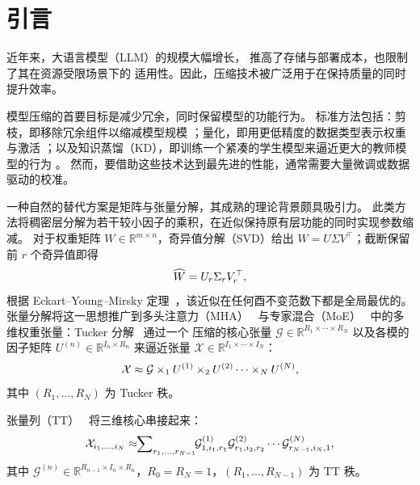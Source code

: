 \section{引言}
\label{sec:intro}

近年来，大语言模型（LLM）的规模大幅增长，
推高了存储与部署成本，也限制了其在资源受限场景下的
适用性。因此，压缩技术被广泛用于在保持质量的同时提升效率。

模型压缩的首要目标是减少冗余，同时保留模型的功能行为。
标准方法包括：剪枝，即移除冗余组件以缩减模型规模 \citep{OBC_2022, LLM_pruner_2023, unreasonable_ineffectiveness_2024}；量化，即用更低精度的数据类型表示权重与激活 \citep{GPTQ_2022, QUIP_2023, AQLM_2024, AWQ_2024, harp}；以及知识蒸馏（KD），即训练一个紧凑的学生模型来逼近更大的教师模型的行为 \citep{HintonDistil_2015, GKD_2023}。
然而，要借助这些技术达到最先进的性能，通常需要大量微调或数据驱动的校准。

一种自然的替代方案是矩阵与张量分解，其成熟的理论背景颇具吸引力。
此类方法将稠密层分解为若干较小因子的乘积，在近似保持原有层功能的同时实现参数缩减。
对于权重矩阵 $W \in \mathbb{R}^{m \times n}$，奇异值分解（SVD）给出 $W = U\Sigma V^\top$；截断保留前 $r$ 个奇异值即得
\begin{equation}
\label{eq:svd}
\vspace{-1mm}
\widehat{W} = U_r\Sigma_r V_r^\top, 
\end{equation}
根据 Eckart--Young--Mirsky 定理~\citep{Eckart_Young_1936, Eckart_Young_Mirsky_1960}，该近似在任何酉不变范数下都是全局最优的。
张量分解将这一思想推广到多头注意力（MHA）~\citep{Attention_Is_All_You_Need_2017} 与专家混合（MoE）~\citep{MoE_2022} 中的多维权重张量：Tucker 分解~\citep{tucker1966some, kolda2009tensor} 通过一个
压缩的核心张量 $\mathcal{G} \in \mathbb{R}^{R_1 \times \cdots \times R_N}$
以及各模的因子矩阵 $U^{(n)} \in \mathbb{R}^{I_n \times R_n}$ 来逼近张量
$\mathcal{X} \in \mathbb{R}^{I_1 \times \cdots \times I_N}$：
\begin{equation}
    \label{eq:tucker}
    \vspace{-2mm}
    \mathcal{X} \approx \mathcal{G} \times_1 U^{(1)} \times_2 U^{(2)}
    \cdots \times_N U^{(N)},
\end{equation}
其中 $(R_1,\ldots,R_N)$ 为 Tucker 秩。

张量列（TT）~\citep{oseledets2011tensor} 将三维核心串接起来：
\begin{equation}
    \label{eq:tt}
    \vspace{-2mm}
    \mathcal{X}_{i_1,\ldots,i_N} \approx \!\!\sum\nolimits_{r_1,\ldots,r_{N-1}}\!\! \mathcal{G}^{(1)}_{1,i_1,r_1}\mathcal{G}^{(2)}_{r_1,i_2,r_2} \cdots \mathcal{G}^{(N)}_{r_{N-1},i_N,1},
\end{equation}
其中 $\mathcal{G}^{(n)} \in \mathbb{R}^{R_{n-1} \times I_n \times R_n}$，$R_0 = R_N = 1$，$(R_1,\ldots,R_{N-1})$ 为 TT 秩。

